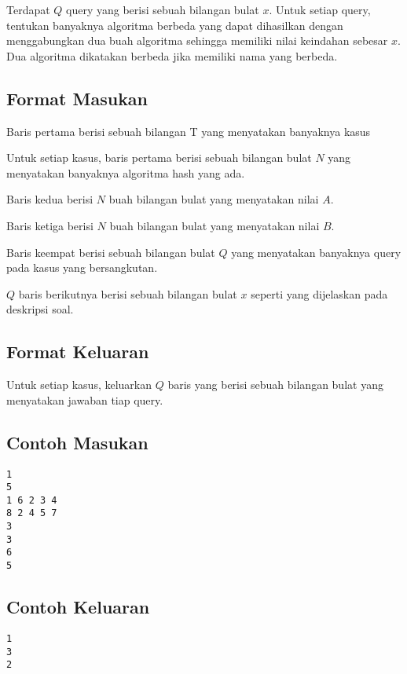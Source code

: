 \documentclass{article}
\begin{document}
\par Terdapat $Q$ query yang berisi sebuah bilangan bulat $x$. Untuk setiap query, tentukan banyaknya algoritma berbeda yang dapat dihasilkan dengan menggabungkan dua buah algoritma sehingga memiliki nilai keindahan sebesar $x$. Dua algoritma dikatakan berbeda jika memiliki nama yang berbeda.

\subsection*{Format Masukan}
\par Baris pertama berisi sebuah bilangan T yang menyatakan banyaknya kasus
\par Untuk setiap kasus, baris pertama berisi sebuah bilangan bulat $N$ yang menyatakan banyaknya algoritma hash yang ada.
\par Baris kedua berisi $N$ buah bilangan bulat yang menyatakan nilai $A$.
\par Baris ketiga berisi $N$ buah bilangan bulat yang menyatakan nilai $B$.
\par Baris keempat berisi sebuah bilangan bulat $Q$ yang menyatakan banyaknya query pada kasus yang bersangkutan.
\par $Q$ baris berikutnya berisi sebuah bilangan bulat $x$ seperti yang dijelaskan pada deskripsi soal.

\subsection*{Format Keluaran}

\par Untuk setiap kasus, keluarkan $Q$ baris yang berisi sebuah bilangan bulat yang menyatakan jawaban tiap query.

\subsection*{Contoh Masukan}

\begin{lstlisting}
1
5
1 6 2 3 4
8 2 4 5 7
3
3
6
5
\end{lstlisting}

\subsection*{Contoh Keluaran}

\begin{lstlisting}
1
3
2
\end{lstlisting}
\end{document}

